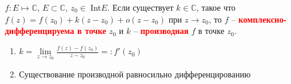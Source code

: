 
\begin{definition} \thmslashn
	
	$f : E \mapsto \mathbb{C}$, $E \subset \mathbb{C}$, $z_0 \in \;$Int$ E$. Если существует $k \in \mathbb{C}$, такое что $f(z) = f(z_0) + k(z - z_0) + o(z - z_0)$ при $z \rightarrow z_0$, то $f$ -- \textcolor{red}{\textbf{комплексно-дифференцируема в точке}} $z_0$ и $k$ -- \textcolor{red}{\textbf{производная}} $f$ в точке $z_0$.
\end{definition}

\begin{remark} \thmslashn

	\begin{enumerate} 
		\item $k = \lim\limits_{z \to z_0} \frac{f(z) - f(z_0)}{z - z_0} =: f'(z_0)$
		\item Существование производной равносильно дифференцированию
	\end{enumerate}
\end{remark}

